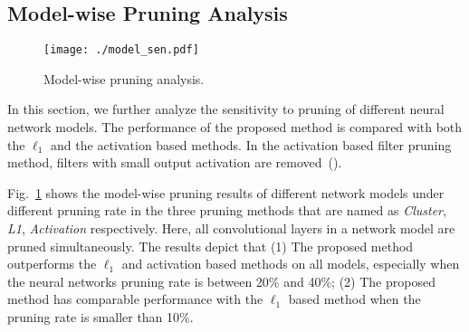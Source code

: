 \documentclass{article} %
\begin{document}
\subsection{Model-wise Pruning Analysis}\begin{figure}[b]
  \centering
  \texttt{[image: ./model\_sen.pdf]}
  \caption{Model-wise pruning analysis.}
  \label{fig:model}
  \vspace{-2mm}
\end{figure}

In this section, we further analyze the sensitivity to pruning of different neural network models.
The performance of the proposed method is compared with both the $\ell_1$ and the activation based methods. 
In the activation based filter pruning method, filters with small output activation are removed~(\cite{polyak2015channel}).

Fig.~\ref{fig:model} shows the model-wise pruning results of different network models under different pruning rate in the three pruning methods that are named as \emph{Cluster}, \emph{L1}, \emph{Activation} respectively. 
Here, all convolutional layers in a network model are pruned simultaneously.
The results depict that
(1) The proposed method outperforms the $\ell_1$ and activation based methods on all models, especially when the neural networks pruning rate is between 20\% and 40\%;
(2) The proposed method has comparable performance with the $\ell_1$ based method when the pruning rate is smaller than 10\%. 
\end{document}
